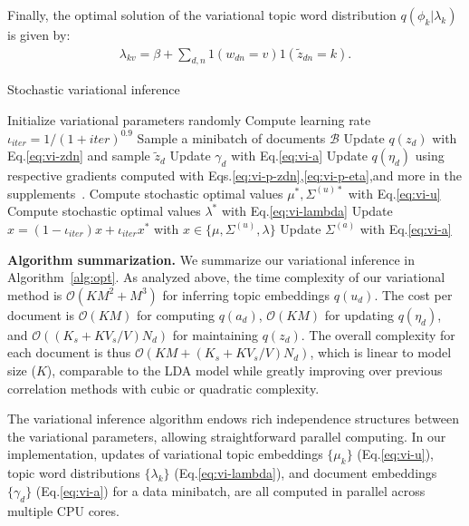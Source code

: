\documentclass[sigconf]{acmart}
\renewcommand*{\bm}[1]{#1}%
\begin{document}
Finally, the optimal solution of the variational topic word distribution $q(\bm{\phi}_k | \bm{\lambda}_k)$ is given by:
\begin{equation}
\begin{split}
\lambda_{kv} = \beta + \sum\nolimits_{d,n}\bm{1}(w_{dn}=v) \bm{1}(\tilde{z}_{dn}=k).
\end{split}
\label{eq:vi-lambda}
\end{equation}

\begin{algorithm}[t]
\centering
\caption{\small Stochastic variational inference}
\label{alg:opt}
\begin{algorithmic}[1]
\STATE Initialize variational parameters randomly
\REPEAT
    \STATE Compute learning rate $\iota_{\textit{iter}}=1/(1+\textit{iter})^{0.9}$
    \STATE Sample a minibatch of documents $\mathcal{B}$
    \REPEAT
    	\STATE Update $q(\bm{z}_d)$ with Eq.\eqref{eq:vi-zdn} and sample $\tilde{\bm{z}}_d$
        \STATE Update $\bm{\gamma}_d$ with Eq.\eqref{eq:vi-a}
        \STATE Update $q(\bm{\eta}_d)$ using respective gradients computed with Eqs.\eqref{eq:vi-p-zdn},\eqref{eq:vi-p-eta},and more in the supplements~\cite{supplement}.
    \STATE Compute stochastic optimal values $\bm{\mu}^{*}, \Sigma^{(u)*}$ with Eq.\eqref{eq:vi-u}
    \STATE Compute stochastic optimal values $\bm{\lambda}^{*}$ with Eq.\eqref{eq:vi-lambda}
    \STATE Update $\bm{x} = (1-\iota_\textit{iter})\bm{x}+\iota_\textit{iter}\bm{x}^{*}$ with $\bm{x}\in\{\bm{\mu}, \Sigma^{(u)}, \bm{\lambda}\}$
    \STATE Update $\Sigma^{(a)}$ with Eq.\eqref{eq:vi-a}
    \ENDFOR
{}
\end{algorithmic}
\end{algorithm}

{\bf Algorithm summarization. } 
We summarize our variational inference in Algorithm~\ref{alg:opt}. 
As analyzed above, the time complexity of our variational method is $\mathcal{O}(KM^2+M^3)$ for inferring topic embeddings $q(\bm{u}_{d})$. The cost per document is $\mathcal{O}(KM)$ for computing $q(\bm{a}_d)$, $\mathcal{O}(KM)$ for updating $q(\bm{\eta}_d)$, and $\mathcal{O}((K_s+KV_s/V)N_d)$ for maintaining $q(\bm{z}_{d})$. The overall complexity for each document is thus $\mathcal{O}(KM+(K_s+KV_s/V)N_d)$, which is linear to model size ($K$), comparable to the LDA model while greatly improving over previous correlation methods with cubic or quadratic complexity. 

The variational inference algorithm endows rich independence structures between the variational parameters, allowing straightforward parallel computing. In our implementation, updates of variational topic embeddings $\{\bm{\mu}_k\}$ (Eq.\eqref{eq:vi-u}), topic word distributions $\{\bm{\lambda}_k\}$ (Eq.\eqref{eq:vi-lambda}), and document embeddings $\{\bm{\gamma}_d\}$ (Eq.\eqref{eq:vi-a}) for a data minibatch, are all computed in parallel across multiple CPU cores. 
\end{document}
